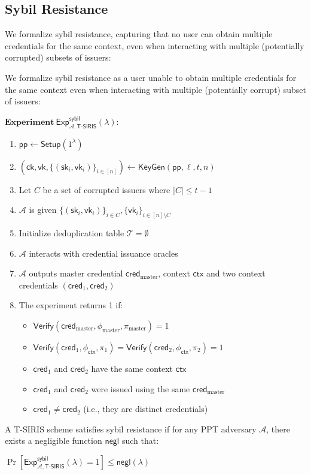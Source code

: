 \subsection{Sybil Resistance}

We formalize sybil resistance, capturing that no user can obtain multiple credentials for the same context, even when interacting with multiple (potentially corrupted) subsets of issuers:

\begin{definition}
We formalize sybil resistance as a user unable to obtain multiple credentials for the same context even when interacting with multiple (potentially corrupt) subset of issuers:

$\textbf{Experiment}~\mathsf{Exp}^{\mathsf{sybil}}_{\mathcal{A},\mathsf{T\text{-}SIRIS}}(\lambda):$
\begin{enumerate}
    \item $\mathsf{pp} \leftarrow \mathsf{Setup}(1^\lambda)$
    \item $(\mathsf{ck}, \mathsf{vk}, \{(\mathsf{sk}_i, \mathsf{vk}_i)\}_{i\in[n]}) \leftarrow \mathsf{KeyGen}(\mathsf{pp}, \ell, t, n)$
    \item Let $C$ be a set of corrupted issuers where $|C| \leq t-1$
    \item $\mathcal{A}$ is given $\{(\mathsf{sk}_i, \mathsf{vk}_i)\}_{i\in C}, \{\mathsf{vk}_i\}_{i\in[n]\setminus C}$
    \item Initialize deduplication table $\mathcal{T} = \emptyset$
    \item $\mathcal{A}$ interacts with credential issuance oracles
    \item $\mathcal{A}$ outputs master credential $\mathsf{cred}_{\text{master}}$, context $\mathsf{ctx}$ and two context credentials $(\mathsf{cred}_1, \mathsf{cred}_2)$
    \item The experiment returns 1 if:
    \begin{itemize}
        \item $\mathsf{Verify}(\mathsf{cred}_{\text{master}}, \phi_{\text{master}}, \pi_{\text{master}}) = 1$
        \item $\mathsf{Verify}(\mathsf{cred}_1, \phi_{\mathsf{ctx}}, \pi_1) = \mathsf{Verify}(\mathsf{cred}_2, \phi_{\mathsf{ctx}}, \pi_2) = 1$
        \item $\mathsf{cred}_1$ and $\mathsf{cred}_2$ have the same context $\mathsf{ctx}$
        \item $\mathsf{cred}_1$ and $\mathsf{cred}_2$ were issued using the same $\mathsf{cred}_{\text{master}}$
        \item $\mathsf{cred}_1 \neq \mathsf{cred}_2$ (i.e., they are distinct credentials)
    \end{itemize}
\end{enumerate}

A T-SIRIS scheme satisfies sybil resistance if for any PPT adversary $\mathcal{A}$, there exists a negligible function $\mathsf{negl}$ such that:

$\Pr[\mathsf{Exp}^{\mathsf{sybil}}_{\mathcal{A},\mathsf{T\text{-}SIRIS}}(\lambda) = 1] \leq \mathsf{negl}(\lambda)$
\end{definition}



